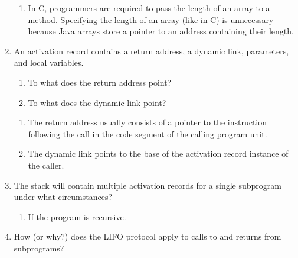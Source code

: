 \begin{enumerate}
  
    \begin{answer}

    \begin{enumerate}
    \item In C, programmers are required to pass the length of an array to a method. 
Specifying the length of an array (like in C) is unnecessary because Java arrays
 store a pointer to an address containing their length.
 
    \end{enumerate}

    \end{answer}

  \item An activation record contains a return
    address, a dynamic link, parameters, and
    local variables.
  \begin{enumerate}
    \item To what does the return address point?
    \item To what does the dynamic link point?
    \end{enumerate}

  
    \begin{answer}

    \begin{enumerate}
    \item The return address usually consists of a pointer to the instruction following 
the call in the code segment of the calling program unit. 
    \item The dynamic link points to the base of the activation record instance of the caller.
    \end{enumerate}

    \end{answer}

  \item The stack will contain multiple activation
    records for a single subprogram under what
    circumstances?

    \begin{answer}

    \begin{enumerate}
    \item If the program is recursive. 
    \end{enumerate}

    \end{answer}
  
  \item How (or why?) does the LIFO protocol apply to
    calls to and returns from subprograms?


\end{enumerate}

